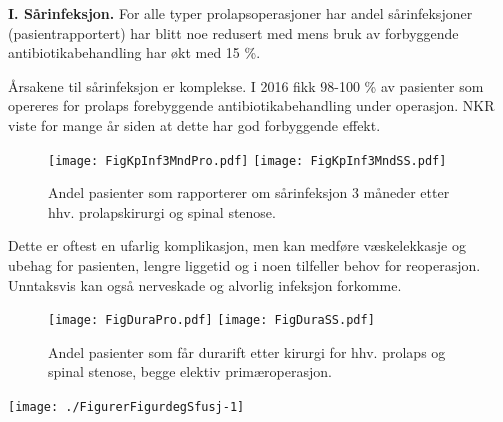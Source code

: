 \documentclass [norsk,a4paper,twoside]{article}\usepackage[]{graphicx}\usepackage[]{color}
\newenvironment{knitrout}{}{} %
\begin{document}


\textbf{I. Sårinfeksjon.}
For alle typer prolapsoperasjoner har
andel sårinfeksjoner (pasientrapportert) har blitt noe redusert med mens
bruk av forbyggende antibiotikabehandling har økt med 15 \%. 

Årsakene til sårinfeksjon er komplekse. I 2016 fikk 98-100 \% av pasienter som
opereres for prolaps forebyggende antibiotikabehandling under operasjon. NKR
viste for mange år siden at dette har god forbyggende effekt.

\begin{figure}[ht]
\centering \texttt{[image: FigKpInf3MndPro.pdf]}
\centering \texttt{[image: FigKpInf3MndSS.pdf]}
\caption{\label{fig:KpInf} Andel pasienter som rapporterer om sårinfeksjon 3 måneder etter
hhv. prolapskirurgi og spinal stenose.}
\end{figure}



Dette er oftest en ufarlig komplikasjon, men kan medføre væskelekkasje og
ubehag for pasienten, lengre liggetid og i noen tilfeller behov for reoperasjon.
Unntaksvis kan også nerveskade og alvorlig infeksjon forkomme.
\begin{figure}[ht]
\centering \texttt{[image: FigDuraPro.pdf]}
\centering \texttt{[image: FigDuraSS.pdf]}
\caption{\label{fig:Dura} Andel pasienter som får durarift etter kirurgi for hhv. prolaps og spinal stenose, begge elektiv primæroperasjon.}
\end{figure}

\begin{knitrout}
\color{fgcolor}

{\centering \texttt{[image: ./FigurerFigurdegSfusj-1]} 

}



\end{knitrout}
\end{document}
